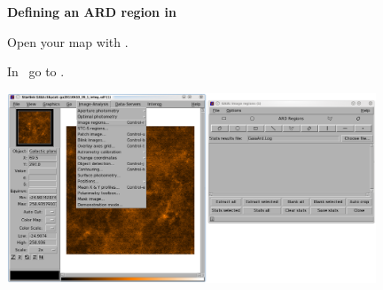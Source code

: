 \documentclass[11pt,oneside,chapters]{starlink}
\begin{document}
\begin{figure}[ht!]
\begin{center}
\begin{fmpage}{0.99\linewidth}
\vspace{0.2cm}
\hspace{0.2cm}
\textbf{Defining an ARD region in \gaia}

\vspace{0.5cm}
\hspace{0.1cm}
\begin{minipage}[c]{0.23\linewidth}
Open your map with \gaia.
\end{minipage}
\hspace{0.2cm}
\begin{minipage}[c]{0.72\linewidth}
\begin{terminalv}
\end{terminalv}
\end{minipage}

\vspace{0.5cm}
\hspace{0.1cm}
\begin{minipage}[c]{0.23\linewidth}
In \gaia\ go to .
\end{minipage}
\hspace{0.2cm}
\begin{minipage}[c]{0.72\linewidth}
\centering
\includegraphics[width=0.98\textwidth]{sc20_ard7.eps}
\end{minipage}

\vspace{0.5cm}


\end{fmpage}
\end{center}
\end{figure}
\end{document}
